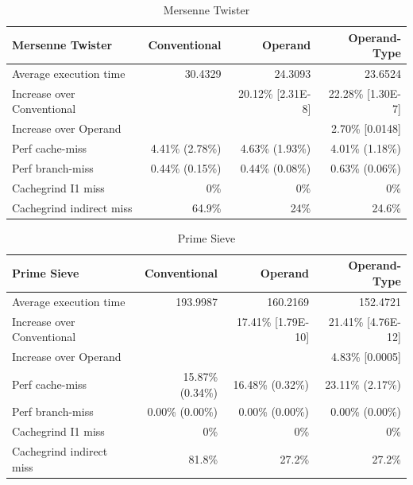 \documentclass[english,a4paper,12pt]{report}
\begin{document}
\begin{table}[!htb]
  \begin{center}
    \begin{tabular}{lrrr}
      Mersenne Twister & Conventional & Operand & Operand-Type\\
      \hline
      Average execution time & 30.4329 & 24.3093 & 23.6524\\
      Increase over Conventional &  & 20.12\% [2.31E-8] & 22.28\% [1.30E-7]\\
      Increase over Operand &  &  & 2.70\% [0.0148]\\
      Perf cache-miss & 4.41\% (2.78\%) & 4.63\% (1.93\%) & 4.01\% (1.18\%)\\
      Perf branch-miss & 0.44\% (0.15\%) & 0.44\% (0.08\%) & 0.63\% (0.06\%)\\
      Cachegrind I1 miss & 0\% & 0\% & 0\%\\
      Cachegrind indirect miss & 64.9\% & 24\% & 24.6\%\\
    \end{tabular}
  \end{center}
  \caption{Mersenne Twister}
\end{table}

\begin{table}[!htb]
  \begin{center}
    \begin{tabular}{lrrr}
      Prime Sieve & Conventional & Operand & Operand-Type\\
      \hline
      Average execution time & 193.9987 & 160.2169 & 152.4721\\
      Increase over Conventional &  & 17.41\% [1.79E-10] & 21.41\% [4.76E-12]\\
      Increase over Operand &  &  & 4.83\% [0.0005]\\
      Perf cache-miss & 15.87\% (0.34\%) & 16.48\% (0.32\%) & 23.11\% (2.17\%)\\
      Perf branch-miss & 0.00\% (0.00\%) & 0.00\% (0.00\%) & 0.00\% (0.00\%)\\
      Cachegrind I1 miss & 0\% & 0\% & 0\%\\
      Cachegrind indirect miss & 81.8\% & 27.2\% & 27.2\%\\
    \end{tabular}
  \end{center}
  \caption{Prime Sieve}
\end{table}
\end{document}
